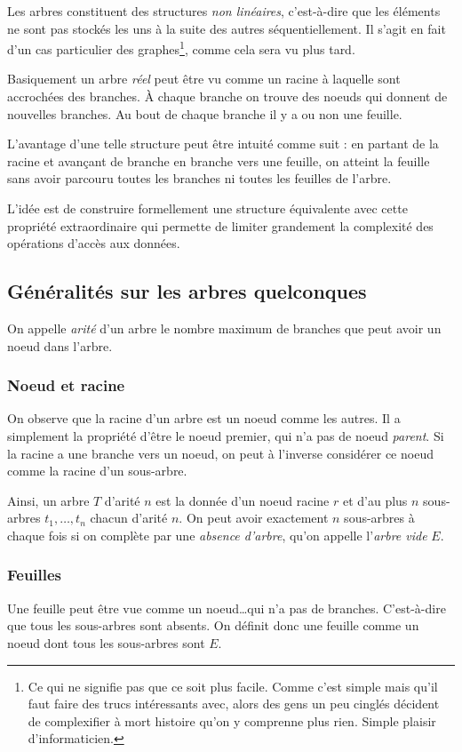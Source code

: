 \documentclass[../../../main.tex]{subfiles}
\begin{document}
Les arbres constituent des structures \textit{non linéaires}, c'est-à-dire que les éléments ne sont pas stockés les uns à la suite des autres séquentiellement. Il s'agit en fait d'un cas particulier des graphes\footnote{Ce qui ne signifie pas que ce soit plus facile. Comme c'est simple mais qu'il faut faire des trucs intéressants avec, alors des gens un peu cinglés décident de complexifier à mort histoire qu'on y comprenne plus rien. Simple plaisir d'informaticien.}, comme cela sera vu plus tard.

Basiquement un arbre \textit{réel} peut être vu comme un racine à laquelle sont accrochées des branches. À chaque branche on trouve des noeuds qui donnent de nouvelles branches. Au bout de chaque branche il y a ou non une feuille.

L'avantage d'une telle structure peut être intuité comme suit : en partant de la racine et avançant de branche en branche vers une feuille, on atteint la feuille sans avoir parcouru toutes les branches ni toutes les feuilles de l'arbre.

L'idée est de construire formellement une structure équivalente avec cette propriété extraordinaire qui permette de limiter grandement la complexité des opérations d'accès aux données.
\subsection{Généralités sur les arbres quelconques}
On appelle \textit{arité} d'un arbre le nombre maximum de branches que peut avoir un noeud dans l'arbre.

\subsubsection{Noeud et racine}
On observe que la racine d'un arbre est un noeud comme les autres. Il a simplement la propriété d'être le noeud premier, qui n'a pas de noeud \textit{parent}. Si la racine a une branche vers un noeud, on peut à l'inverse considérer ce noeud comme la racine d'un sous-arbre.

Ainsi, un arbre $T$ d'arité $n$ est la donnée d'un noeud racine $r$ et d'au plus $n$ sous-arbres $t_1, \dots, t_n$ chacun d'arité $n$. On peut avoir exactement $n$ sous-arbres à chaque fois si on complète par une \textit{absence d'arbre}, qu'on appelle l'\textit{arbre vide} $E$.
\subsubsection{Feuilles}
Une feuille peut être vue comme un noeud\dots qui n'a pas de branches. C'est-à-dire que tous les sous-arbres sont absents. On définit donc une feuille comme un noeud dont tous les sous-arbres sont $E$.
\end{document}
